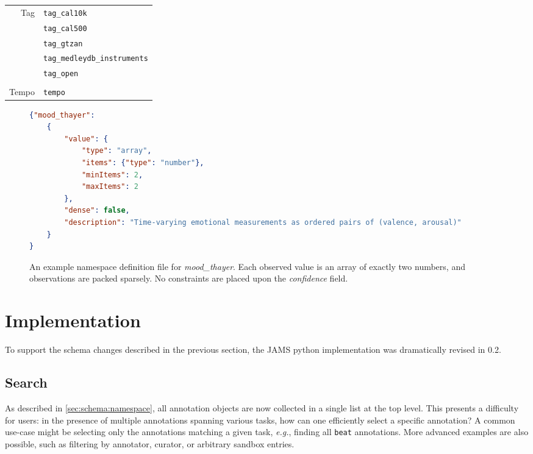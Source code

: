 \documentclass{article}
\begin{document}
\begin{table}
\begin{tabular}{rl}
\\
    Tag        & \texttt{tag\_cal10k}\\
                                & \texttt{tag\_cal500}\\
                                & \texttt{tag\_gtzan}\\
                                & \texttt{tag\_medleydb\_instruments}\\
                                & \texttt{tag\_open}\\
\\
    Tempo                       & \texttt{tempo}\\
    \bottomrule
    \end{tabular}
\end{table}


\begin{figure}
    \begin{lstlisting}[language=json,title={mood\_thayer.json}]
{"mood_thayer":
    {
        "value": {
            "type": "array",
            "items": {"type": "number"},
            "minItems": 2,
            "maxItems": 2
        },
        "dense": false,
        "description": "Time-varying emotional measurements as ordered pairs of (valence, arousal)"
    }
}
\end{lstlisting}
\caption{An example namespace definition file for \emph{mood\_thayer}.  Each observed
value is an array of exactly two numbers, and observations are packed sparsely.  No
constraints are placed upon the \emph{confidence} field.\label{fig:thayer}}
\end{figure}


\section{Implementation}\label{sec:implementation}

To support the schema changes described in the previous section, the JAMS python 
implementation was dramatically revised in 0.2.

\subsection{Search}\label{sec:imp:search}
As described in \ref{sec:schema:namespace}, all annotation objects are now collected in a
single list at the top level.  This presents a difficulty for users: in the presence of
multiple annotations spanning various tasks, how can one efficiently select a specific
annotation?  A common use-case might be selecting only the annotations matching a given
task, \emph{e.g.}, finding all \texttt{beat} annotations.  More advanced
examples are also possible, such as filtering by annotator, curator, or arbitrary
sandbox entries.
\end{document}
